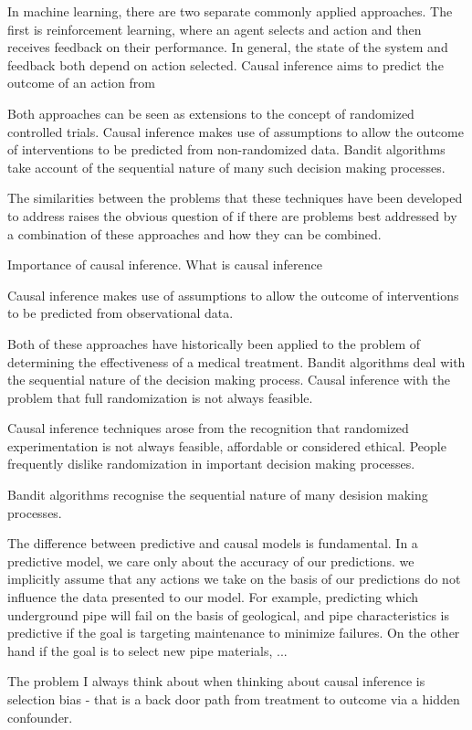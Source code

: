 \documentclass[11pt,a4paper]{article}
\begin{document}
In machine learning, there are two separate commonly applied approaches. The first is reinforcement learning, where an agent selects and action and then receives feedback on their performance. In general, the state of the system and feedback both depend on action selected. Causal inference aims to predict the outcome of an action from 
 
Both approaches can be seen as extensions to the concept of randomized controlled trials. Causal inference makes use of assumptions to allow the outcome of interventions to be predicted from non-randomized data. Bandit algorithms take account of the sequential nature of many such decision making processes. 

The similarities between the problems that these techniques have been developed to address raises the obvious question of if there are problems best addressed by a combination of these approaches and how they can be combined. 
 
Importance of causal inference. 
What is causal inference

Causal inference makes use of assumptions to allow the outcome of interventions to be predicted from observational data. 

Both of these approaches have historically been applied to the problem of determining the effectiveness of a medical treatment. Bandit algorithms deal with the sequential nature of the decision making process. Causal inference with the problem that full randomization is not always feasible. 

Causal inference techniques arose from the recognition that randomized experimentation is not always feasible, affordable or considered ethical. People frequently dislike randomization in important decision making processes. 

Bandit algorithms recognise the sequential nature of many desision making processes. 

The difference between predictive and causal models is fundamental. In a predictive model, we care only about the accuracy of our predictions. we implicitly assume that any actions we take on the basis of our predictions do not influence the data presented to our model. For example, predicting which underground pipe will fail on the basis of geological, and pipe characteristics is predictive if the goal is targeting maintenance to minimize failures. On the other hand if the goal is to select new pipe materials, ...

The problem I always think about when thinking about causal inference is selection bias - that is a back door path from treatment to outcome via a hidden confounder. 
\end{document}
